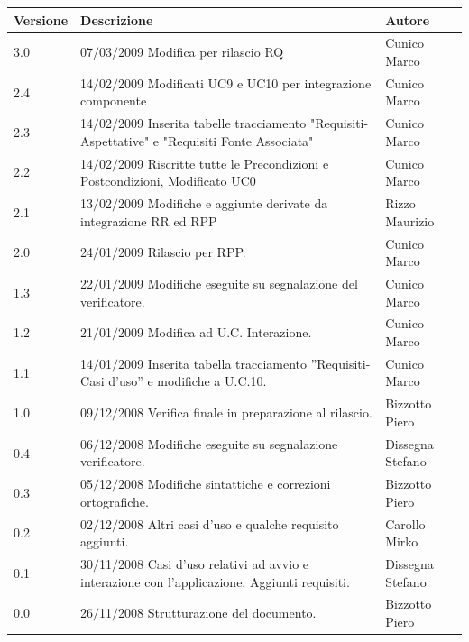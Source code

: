 \begin{center}
	\begin{table}[h]
		  \begin{tabular*}
			{1\textwidth}%
					 {@{\extracolsep{\fill}}|p{}|p{}|p{}|}
		 \hline
			\textbf{Versione}  & \textbf{Descrizione} & \textbf{Autore} \\

				\hline
                3.0 & 07$\slash$03$\slash$2009 Modifica per rilascio RQ & Cunico Marco\\
				\hline
                2.4 & 14$\slash$02$\slash$2009 Modificati UC9 e UC10 per integrazione componente & Cunico Marco\\
				\hline
                2.3 & 14$\slash$02$\slash$2009 Inserita tabelle tracciamento "Requisiti-Aspettative" e "Requisiti Fonte Associata" & Cunico Marco\\
				\hline
                2.2 & 14$\slash$02$\slash$2009 Riscritte tutte le Precondizioni e Postcondizioni, Modificato UC0 & Cunico Marco\\
                \hline
                2.1 & 13$\slash$02$\slash$2009 Modifiche e aggiunte derivate da integrazione RR ed RPP & Rizzo Maurizio\\
                \hline
				2.0 & 24$\slash$01$\slash$2009 Rilascio per RPP. & Cunico Marco \\
		\hline
				1.3 & 22$\slash$01$\slash$2009 Modifiche eseguite su segnalazione del verificatore.  & Cunico Marco \\
                \hline
				1.2 & 21$\slash$01$\slash$2009 Modifica ad U.C. Interazione.  & Cunico Marco \\
                \hline
				1.1 & 14$\slash$01$\slash$2009 Inserita tabella tracciamento ''Requisiti-Casi d'uso'' e modifiche a U.C.10. & Cunico Marco \\
				\hline
				1.0 & 09$\slash$12$\slash$2008  Verifica finale in preparazione al rilascio. & Bizzotto Piero \\
				\hline
				0.4 & 06$\slash$12$\slash$2008 Modifiche eseguite su segnalazione verificatore. & Dissegna Stefano \\
				\hline
				0.3 & 05$\slash$12$\slash$2008 Modifiche sintattiche e correzioni ortografiche. & Bizzotto Piero \\
				\hline
				0.2 & 02$\slash$12$\slash$2008 Altri casi d'uso e qualche requisito aggiunti. & Carollo Mirko \\
                \hline
                0.1 & 30$\slash$11$\slash$2008 Casi d'uso relativi ad avvio e interazione con l'applicazione. Aggiunti requisiti. & Dissegna Stefano \\
				\hline	
    	 	     0.0 & 26$\slash$11$\slash$2008 Strutturazione del documento. & Bizzotto Piero \\


\end{tabular*}
\end{table}
\end{center}
